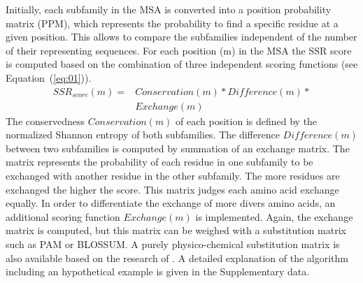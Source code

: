 \documentclass{bioinfo}
\begin{document}
%
Initially, each subfamily in the MSA is converted into a position 
probability matrix (PPM), which represents the probability to find a specific 
residue at a given position. This allows to compare the subfamilies 
independent of the number of their representing sequences. 
For each position (m) in the MSA the SSR score is computed based on the combination 
of three independent scoring functions (see Equation~(\ref{eq:01})).
%
\begin{equation}
\begin{aligned}
SSR_{score}(m) = & Conservation(m) * Difference(m) * \\ 
& Exchange(m) \label{eq:01} %
\end{aligned}
\end{equation}  
%
The conservedness $Conservation(m)$ of each position is defined by the normalized Shannon entropy 
of both subfamilies. %
%
%
The difference $Difference(m)$ between two subfamilies is computed by summation of an exchange matrix. The matrix
represents the probability of each residue in one subfamily to be exchanged with another residue in 
the other subfamily. The more residues are exchanged the higher the score.
This matrix judges each amino acid exchange equally.
%
In order to differentiate the exchange of more divers amino acids,
an additional scoring function $Exchange(m)$ is implemented. 
Again, the exchange matrix is computed, but
this matrix can be weighed with a substitution matrix such as
PAM or BLOSSUM. A purely physico-chemical substitution matrix is also
available based on the research of \citealp{Chrysostomou01}.
%
A detailed explanation of the algorithm including an 
hypothetical example is given in the Supplementary data.
\end{document}
